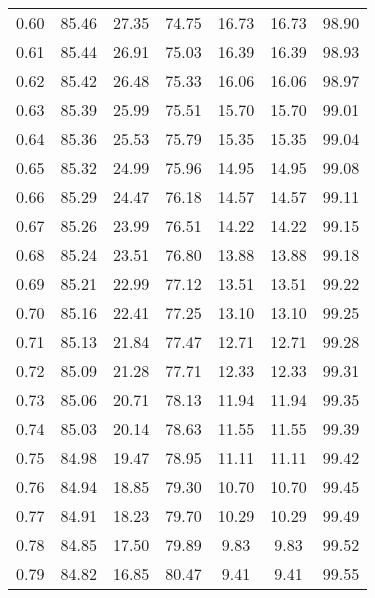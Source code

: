 \begin{tabular}{|c|c|c|c|c|c|c|}
      0.60 &     85.46 &     27.35 &      74.75 &   16.73 &      16.73 &         98.90 \\
      0.61 &     85.44 &     26.91 &      75.03 &   16.39 &      16.39 &         98.93 \\
      0.62 &     85.42 &     26.48 &      75.33 &   16.06 &      16.06 &         98.97 \\
      0.63 &     85.39 &     25.99 &      75.51 &   15.70 &      15.70 &         99.01 \\
      0.64 &     85.36 &     25.53 &      75.79 &   15.35 &      15.35 &         99.04 \\
      0.65 &     85.32 &     24.99 &      75.96 &   14.95 &      14.95 &         99.08 \\
      0.66 &     85.29 &     24.47 &      76.18 &   14.57 &      14.57 &         99.11 \\
      0.67 &     85.26 &     23.99 &      76.51 &   14.22 &      14.22 &         99.15 \\
      0.68 &     85.24 &     23.51 &      76.80 &   13.88 &      13.88 &         99.18 \\
      0.69 &     85.21 &     22.99 &      77.12 &   13.51 &      13.51 &         99.22 \\
      0.70 &     85.16 &     22.41 &      77.25 &   13.10 &      13.10 &         99.25 \\
      0.71 &     85.13 &     21.84 &      77.47 &   12.71 &      12.71 &         99.28 \\
      0.72 &     85.09 &     21.28 &      77.71 &   12.33 &      12.33 &         99.31 \\
      0.73 &     85.06 &     20.71 &      78.13 &   11.94 &      11.94 &         99.35 \\
      0.74 &     85.03 &     20.14 &      78.63 &   11.55 &      11.55 &         99.39 \\
      0.75 &     84.98 &     19.47 &      78.95 &   11.11 &      11.11 &         99.42 \\
      0.76 &     84.94 &     18.85 &      79.30 &   10.70 &      10.70 &         99.45 \\
      0.77 &     84.91 &     18.23 &      79.70 &   10.29 &      10.29 &         99.49 \\
      0.78 &     84.85 &     17.50 &      79.89 &    9.83 &       9.83 &         99.52 \\
      0.79 &     84.82 &     16.85 &      80.47 &    9.41 &       9.41 &         99.55 \\

\end{tabular}
